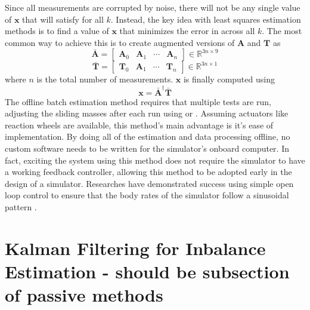 Since all measurements are corrupted by noise, there will not be any single value of $\bm{x}$ that will satisfy  for all $k$. Instead, the key idea with least squares estimation methods is to find a value of $\bm{x}$ that minimizes the error in  across all $k$. The most common way to achieve this is to create augmented versions of $\bm{A}$ and $\bm{T}$ as
\begin{equation}
    \bar{\bm{A}}=\begin{bmatrix}
        \bm{A}_0 & \bm{A}_1 & \cdots & \bm{A}_n
    \end{bmatrix}\in \mathbb{R}^{3n \times 9}
\end{equation}
\begin{equation}
    \bar{\bm{T}}=\begin{bmatrix}
        \bm{T}_0 & \bm{A}_1 & \cdots & \bm{T}_n
    \end{bmatrix}\in \mathbb{R}^{3n \times 1}
\end{equation}
where $n$ is the total number of measurements. $\bm{x}$ is finally computed using 
\begin{equation}
    \bm{x}=\bar{\bm{A}}^{\dagger}\bar{\bm{T}}
\end{equation}
The offline batch estimation method requires that multiple tests are run, adjusting the sliding masses after each run using  or . Assuming actuators like reaction wheels are available, this method's main advantage is it's ease of implementation. By doing all of the estimation and data processing offline, no custom software needs to be written for the simulator's onboard computer. In fact, exciting the system using this method does not require the simulator to have a working feedback controller, allowing this method to be adopted early in the design of a simulator. Researches have demonstrated success using simple open loop control to ensure that the body rates of the simulator follow a sinusoidal pattern \cite{kim_automatic_2009} \cite{dam_applied_2014} \cite{noauthor_designing_2003}.



\section{Kalman Filtering for Inbalance Estimation  - should be subsection of passive methods}

